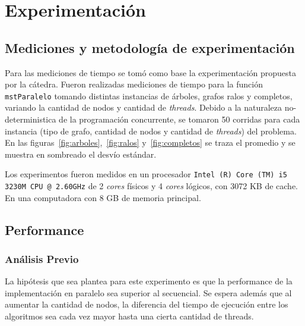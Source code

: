 \section{Experimentación}
\subsection{Mediciones y metodología de experimentación}

Para las mediciones de tiempo se tomó como base la experimentación propuesta
por la cátedra.
Fueron realizadas mediciones de tiempo para la función \texttt{mstParalelo}
tomando distintas instancias de árboles, grafos ralos y completos, variando la
cantidad de nodos y cantidad de \textit{threads}.
Debido a la naturaleza no-deterministica de la programación concurrente, se
tomaron 50 corridas para cada instancia (tipo de grafo, cantidad de nodos y
cantidad de \textit{threads}) del problema. En las
figuras~\ref{fig:arboles},~\ref{fig:ralos} y~\ref{fig:completos} se traza el
promedio y se muestra en sombreado el desvío estándar.

Los experimentos fueron medidos en un procesador \texttt{Intel (R) Core (TM) i5
3230M CPU @ 2.60GHz} de 2 \textit{cores} físicos y 4 \textit{cores} lógicos,
con 3072 KB de cache. En una computadora con 8 GB de memoria principal.

\subsection{Performance}

\subsubsection{Análisis Previo}
La hipótesis que sea plantea para este experimento es que la performance de la 
implementación en paralelo sea superior al secuencial. Se espera además que al 
aumentar la cantidad de nodos, la diferencia del tiempo de ejecución entre los 
algoritmos sea cada vez mayor hasta una cierta cantidad de threads.

